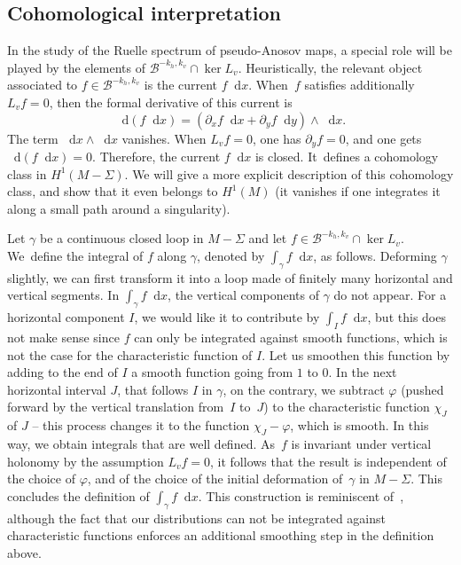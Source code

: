 \documentclass[JEP,XML,SOM,Unicode]{cedram}
\newcommand{\boB}{\mathcal{B}}
\newcommand{\dd}{\mathop{}\!\mathrm{d}}
\let\phi\varphi
\theoremstyle{definition}
\numberwithin{equation}{section}
\begin{document}
\subsection{Cohomological interpretation}
\label{subsec:cohomological}

In the study of the Ruelle spectrum of pseudo-Anosov maps, a special role
will be played by the elements of $\boB^{-k_h, k_v} \cap \ker L_v$.
Heuristically, the relevant object associated to $f \in \boB^{-k_h, k_v}$ is
the current $f \dd x$. When~$f$ satisfies additionally $L_v f = 0$, then the
formal derivative of this current is
\[
\dd (f \dd x)=(\partial_x f \dd x +
\partial_y f \dd y) \wedge \dd x.
\]
The term $\dd x \wedge \dd x$ vanishes.
When $L_v f = 0$, one has $\partial_y f = 0$, and one gets $\dd (f \dd x)=0$.
Therefore, the current $f \dd x$ is closed. It~defines a cohomology class in
$H^1(M-\Sigma)$. We will give a more explicit description of this cohomology
class, and show that it even belongs to $H^1(M)$ (\ie it vanishes if one
integrates it along a small path around a singularity).

Let $\gamma$ be a continuous closed loop in $M-\Sigma$ and let $f \in
\boB^{-k_h, k_v} \cap \ker L_v$. We~define the integral of $f$ along
$\gamma$, denoted by $\int_\gamma f \dd x$, as follows. Deforming $\gamma$
slightly, we can first transform it into a loop made of finitely many
horizontal and vertical segments. In $\int_\gamma f \dd x$, the vertical
components of $\gamma$ do not appear. For a horizontal component $I$, we
would like it to contribute by $\int_I f \dd x$, but this does not make sense
since $f$ can only be integrated against smooth functions, which is not the
case for the characteristic function of $I$. Let us smoothen this function by
adding to the end of $I$ a smooth function going from $1$ to $0$. In the next
horizontal interval $J$, that follows $I$ in $\gamma$, on the contrary, we
subtract $\phi$ (pushed forward by the vertical translation from~$I$ to~$J$)
to the characteristic function $\chi_J$ of $J$ -- this process changes it to
the function $\chi_J - \phi$, which is smooth. In this way, we obtain
integrals that are well defined. As~$f$ is invariant under vertical holonomy
by the assumption $L_v f = 0$, it follows that the result is independent of
the choice of $\phi$, and of the choice of the initial deformation of~$\gamma$ in $M-\Sigma$. This concludes the definition of $\int_\gamma f \dd
x$. This construction is reminiscent
of~\cite[\S1.3]{bufetov_translation_flow}, although the fact that our
distributions can not be integrated against characteristic functions enforces
an additional smoothing step in the definition above.
\end{document}
